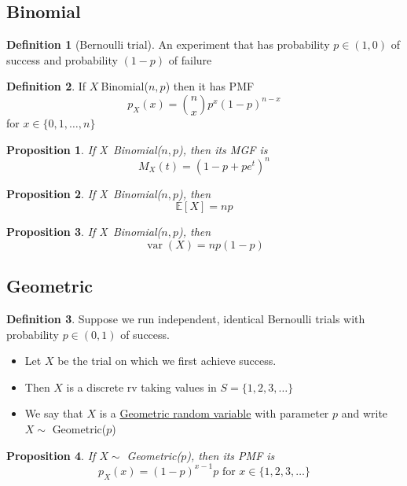 \documentclass[
]{article}
\newtheorem{proposition}{Proposition}[section]
\theoremstyle{definition}
\newtheorem{definition}{Definition}[section]
\theoremstyle{definition}
\theoremstyle{definition}
\theoremstyle{remark}
\newcommand{\pxx}{p_X(x)}
\newcommand{\E}[1]{\mathbb{E}[#1]}
\newcommand{\varx}{\operatorname{var}(X)}
\begin{document}
\subsection{Binomial}

\begin{definition}[Bernoulli trial]
  An experiment that has probability $p\in(1,0)$ of success and probability $(1-p)$ of failure
\end{definition}

\begin{definition}
  If $X~$Binomial($n,p$) then it has PMF
  \[p_X(x)={n\choose x}p^x(1-p)^{n-x}\]
  for $x\in\{0,1,\dots,n\}$
\end{definition}

\begin{proposition}
  If X~Binomial($n,p$), then its MGF is
  \[M_X(t)=(1-p+pe^t)^n\]
\end{proposition}

\begin{proposition}
  If X~Binomial($n,p$), then
  \[\E{X}=np\]
\end{proposition}

\begin{proposition}
  If X~Binomial($n,p$), then
  \[\varx=np(1-p)\]
\end{proposition}

\subsection{Geometric}

\begin{definition}
  Suppose we run independent, identical Bernoulli trials with probability $p\in(0,1)$ of success.
  \begin{itemize}
    \item Let $X$ be the trial on which we first achieve success.
    \item Then $X$ is a discrete rv taking values in $S=\{1,2,3,\dots\}$
    \item We say that $X$ is a \underline{Geometric random variable} with parameter $p$ and write $X\sim$ Geometric($p$)
  \end{itemize}
\end{definition}

\begin{proposition}
  If $X\sim$ Geometric($p$), then its PMF is
  \[\pxx=(1-p)^{x-1}p\text{ for }x\in\{1,2,3,\dots\}\]
\end{proposition}
\end{document}
